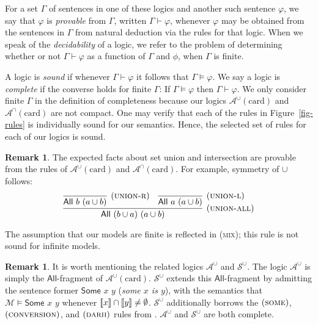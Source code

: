 \documentclass[letterpaper]{article} %
\theoremstyle{definition}
\newtheorem{remark}[theorem]{Remark}
\newcommand{\semantics}[1]{[\![\mbox{\em $ #1 $\/}]\!]}
\newcommand{\Model}{\mathcal{M}}
\newcommand{\proves}{\vdash}
\newcommand{\rem}[1]{\relax}
\newcommand{\Aunion}{\mathscr{A}^{\cup}}
\newcommand{\Sunion}{\mathscr{S}^{\cup}}
\newcommand{\Ainter}{\mathscr{A}^{\cap}}
\newcommand{\Sinter}{\mathscr{S}^{\cap}}
\newcommand{\proverule}{\textsc}
\newcommand{\unionl}{\proverule{union-l}}
\newcommand{\unionr}{\proverule{union-r}}
\newcommand{\unionall}{\proverule{union-all}}
\newcommand{\some}{\proverule{some}}
\newcommand{\conversion}{\proverule{conversion}}
\newcommand{\darii}{\proverule{darii}}
\newcommand{\mix}{\proverule{mix}}
\newcommand{\All}[2]{\mathsf{All}\,\,#1\,\,#2}
\newcommand{\Some}[2]{\mathsf{Some}\,\,#1\,\,#2}
\newcommand{\AllNoArgs}{\mathsf{All}}
\newcommand{\card}{\mathrm{card}}
\newcommand{\noproof}{\rem}
\begin{document}
For a set $\Gamma$ of sentences in one of these logics and another such sentence $\varphi$, we say that $\varphi$ is \emph{provable} from $\Gamma$, written  $\Gamma \proves \varphi$, whenever $\varphi$ may be obtained from the sentences in $\Gamma$ from natural deduction via the rules for that logic.  
When we speak of the \emph{decidability} of a logic, we refer to the problem of determining whether or not $\Gamma \proves \varphi$ as a function of $\Gamma$ and $\phi$, when $\Gamma$ is finite. 

A logic is \emph{sound} if whenever $\Gamma \proves \varphi$ it follows that $\Gamma \models \varphi$.  We say a logic is \emph{complete} if the converse holds for finite $\Gamma$:  If 
$\Gamma \models \varphi$ then $\Gamma \proves \varphi$. We only consider finite $\Gamma$ in the definition of completeness because our logics $\Aunion(\card)$ and $\Ainter(\card)$ are not compact. %
One may verify that each of the rules in Figure~\ref{fig-rules} is individually sound for our semantics.  Hence, the selected set of rules for each of our logics is sound.

\begin{remark}
The expected facts about set union and intersection are provable from the rules of $\Aunion(\card)$ and $\Ainter(\card)$.  For example, symmetry of $\cup$ follows:
$$
\infer[(\unionall)]{\All{(b\cup a)}{(a\cup b)}}{
\infer[(\unionr)]{\All{b}{(a\cup b)}}{} & 
\infer[(\unionl)]{\All{a}{(a\cup b)}}{}}
$$

The assumption that our models are finite is reflected in (\mix); this rule is not sound for infinite models.
\end{remark}

\begin{remark}
It is worth mentioning the related logics $\Aunion$ and $\Sunion$.  The logic $\Aunion$ is simply the $\AllNoArgs$-fragment of $\Aunion(\card)$.  $\Sunion$ extends this $\AllNoArgs$-fragment by admitting the sentence former $\Some{x}{y}$ (\emph{some $x$ is $y$}), with the semantics that $\Model \models \Some{x}{y}$ whenever $\semantics{x} \cap \semantics{y} \ne \emptyset$.  $\Sunion$ additionally %
borrows the $(\some)$, $(\conversion)$, and $(\darii)$ rules
from \cite{syllogistic_cardinality_comparisons}.  %
$\Aunion$ and $\Sunion$ are both complete. %

\noproof{
$\Aunion$ and $\Sunion$ are complete, as is shown in Section~\ref{s:supp:completeness_Aunion_Sunion}.  We encourage the reader to read these proofs of completeness as a warm-up for the completeness of $\Aunion(\card)$.  The completeness of $\Ainter$ follows from the completeness of $\Aunion$, using the trick described in Section~\ref{s:completenes_intersections}.  However, the completeness of $\Sinter$ does not follow straightforwardly.
}
\label{remark-related-logics}
\end{remark}
\end{document}
